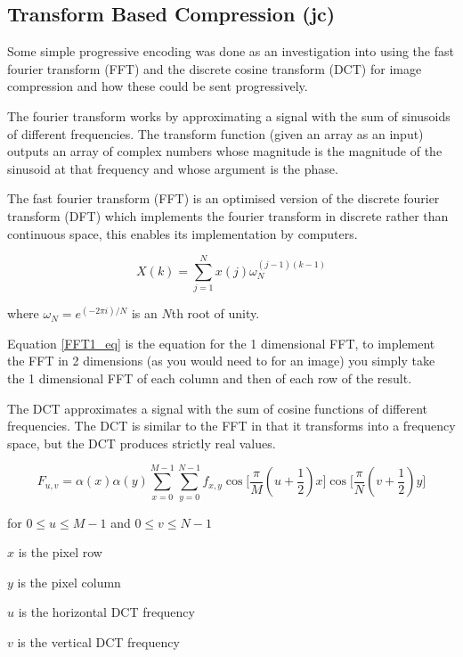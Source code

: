 \subsection{Transform Based Compression (jc)}
\label{transfom_based}

Some simple progressive encoding was done as an investigation into using the fast fourier transform (FFT) and the discrete cosine transform (DCT) for image compression and how these could be sent progressively.

The fourier transform works by approximating a signal with the sum of sinusoids of different frequencies. The transform function (given an array as an input) outputs an array of complex numbers whose magnitude is the magnitude of the sinusoid at that frequency and whose argument is the phase.

The fast fourier transform (FFT) is an optimised version of the discrete fourier transform (DFT) which implements the fourier transform in discrete rather than continuous space, this enables its implementation by computers.

\begin{equation}
X(k) = \sum_{j=1}^N x(j)\omega _N ^{(j-1)(k-1)}
\label{FFT1_eq}
\end{equation}

where
$ \omega _N = e^{(-2 \pi i)/N} $ is an $N$th root of unity.

Equation \ref{FFT1_eq} is the equation for the 1 dimensional FFT, to implement the FFT in 2 dimensions (as you would need to for an image) you simply take the 1 dimensional FFT of each column and then of each row of the result.

The DCT approximates a signal with the sum of cosine functions of different frequencies. The DCT is similar to the FFT in that it transforms into a frequency space, but the DCT produces strictly real values.

\begin{equation}
F_{u,v} = \alpha(x) \alpha(y) \sum_{x=0}^{M-1} \sum_{y=0}^{N-1} f_{x,y} \cos\Big[\dfrac{\pi}{M}(u+\dfrac{1}{2})x\Big]\cos\Big[\dfrac{\pi}{N}(v+\dfrac{1}{2})y\Big]
\label{DCT2_eq}
\end{equation}

for $0 \leq u \leq M - 1 $ and $0 \leq v \leq N - 1 $

$x$ is the pixel row

$y$ is the pixel column

$u$ is the horizontal DCT frequency

$v$ is the vertical DCT frequency

